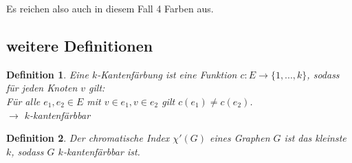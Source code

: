 \documentclass[12pt]{article}
\numberwithin{equation}{subsection}
\newtheorem{df}{Definition}
\begin{document}
	Es reichen also auch in diesem Fall 4 Farben aus.
	\subsection{weitere Definitionen}
	\begin{df}
		Eine \textit{$k$-Kantenfärbung} ist eine Funktion $c:E\to \{1,...,k\}$, sodass für jeden Knoten $v$ gilt:\\
		Für alle $e_1,e_2\in E$ mit $v\in e_1,v\in e_2$ gilt $c(e_1)\neq c(e_2)$.\\
		$\to$ $k$-kantenfärbbar
	\end{df}
	\begin{df}
		Der chromatische Index $\chi'(G)$ eines Graphen $G$ ist das kleinste $k$, sodass $G$ $k$-kantenfärbbar ist.
	\end{df}
\end{document}
